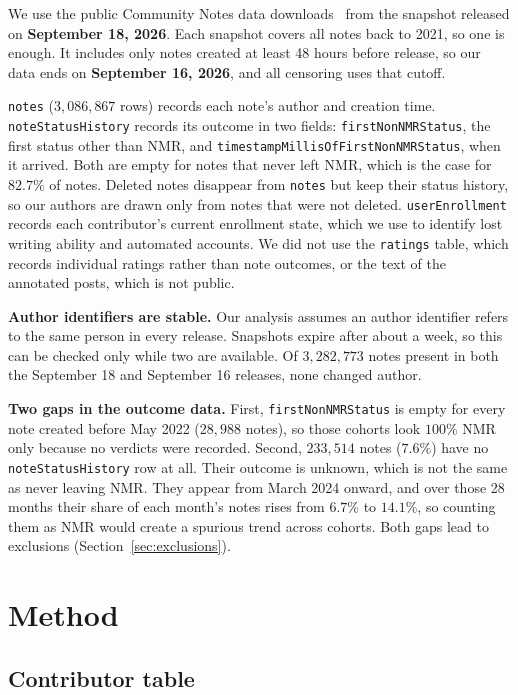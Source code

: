 \documentclass[sigconf,nonacm]{acmart}
\begin{document}
We use the public Community Notes data downloads~\cite{communitynotesdata} from the
snapshot released on \textbf{September 18, 2026}. Each snapshot covers all notes back to
2021, so one is enough. It includes only notes created at least 48 hours before release, so
our data ends on \textbf{September 16, 2026}, and all censoring uses that cutoff.

\begin{sloppypar}
\texttt{notes} ($3{,}086{,}867$ rows) records each note's author and creation time.
\texttt{noteStatusHistory} records its outcome in two fields: \texttt{firstNonNMRStatus},
the first status other than NMR, and \texttt{timestampMillisOf\-FirstNonNMRStatus}, when it
arrived. Both are empty for notes that never left NMR, which is the case for $82.7\%$ of
notes. Deleted notes disappear from \texttt{notes} but keep their status history, so our
authors are drawn only from notes that were not deleted. \texttt{userEnrollment} records
each contributor's current enrollment state, which we use to identify lost writing ability
and automated accounts. We did not use the \texttt{ratings} table, which records individual
ratings rather than note outcomes, or the text of the annotated posts, which is not public.
\end{sloppypar}

\textbf{Author identifiers are stable.} Our analysis assumes an author identifier refers to
the same person in every release. Snapshots expire after about a week, so this can be
checked only while two are available. Of $3{,}282{,}773$ notes present in both the September
18 and September 16 releases, none changed author.

\textbf{Two gaps in the outcome data.} First, \texttt{firstNonNMRStatus} is empty for every
note created before May 2022 ($28{,}988$ notes), so those cohorts look $100\%$ NMR only
because no verdicts were recorded. Second, $233{,}514$ notes ($7.6\%$) have no
\texttt{noteStatusHistory} row at all. Their outcome is unknown, which is not the same as
never leaving NMR. They appear from March 2024 onward, and over those 28 months their share
of each month's notes rises from $6.7\%$ to $14.1\%$, so counting them as NMR would create a
spurious trend across cohorts. Both gaps lead to exclusions (Section~\ref{sec:exclusions}).

\section{Method}

\subsection{Contributor table}
\end{document}

